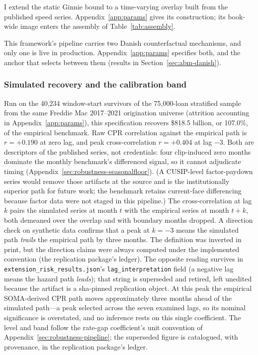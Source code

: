 \documentclass[12pt]{article}
\begin{document}
I extend the static Ginnie bound to a time-varying overlay built from the published speed series. Appendix~\ref{app:params} gives its construction; its book-wide image enters the assembly of Table~\ref{tab:assembly}.

This framework's pipeline carries two Danish counterfactual mechanisms, and only one is live in production. Appendix~\ref{app:params} specifies both, and the anchor that selects between them (results in Section~\ref{sec:abm-danish}).

\subsubsection{Simulated recovery and the calibration band}

Run on the 40,234 window-start survivors of the 75,000-loan stratified sample from the same Freddie Mac 2017--2021 origination universe (attrition accounting in Appendix~\ref{app:params}), this specification recovers \$818.5 billion, or 107.0\%, of the empirical benchmark. Raw CPR correlation against the empirical path is $r = +0.190$ at zero lag, and peak cross-correlation $r = +0.404$ at lag $-3$. Both are descriptors of the published series, not credentials: four clip-induced zero months dominate the monthly benchmark's differenced signal, so it cannot adjudicate timing (Appendix~\ref{sec:robustness-seasonalfloor}). (A CUSIP-level factor-paydown series would remove those artifacts at the source and is the institutionally superior path for future work; the benchmark retains current-face differencing because factor data were not staged in this pipeline.) The cross-correlation at lag $k$ pairs the simulated series at month $t$ with the empirical series at month $t+k$, both demeaned over the overlap and with boundary months dropped. A direction check on synthetic data confirms that a peak at $k=-3$ means the simulated path \emph{trails} the empirical path by three months. The definition was inverted in print, but the direction claims were always computed under the implemented convention (the replication package's ledger). The opposite reading survives in \texttt{extension\_risk\_results.json}'s \texttt{lag\_interpretation} field (a negative lag means the hazard path \emph{leads}); that string is superseded and retired, left unedited because the artifact is a sha-pinned replication object. At this peak the empirical SOMA-derived CPR path moves approximately three months ahead of the simulated path---a peak selected across the seven examined lags, so its nominal significance is overstated, and no inference rests on this single coefficient. The level and band follow the rate-gap coefficient's unit convention of Appendix~\ref{sec:robustness-pipeline}; the superseded figure is catalogued, with provenance, in the replication package's ledger.
\end{document}
